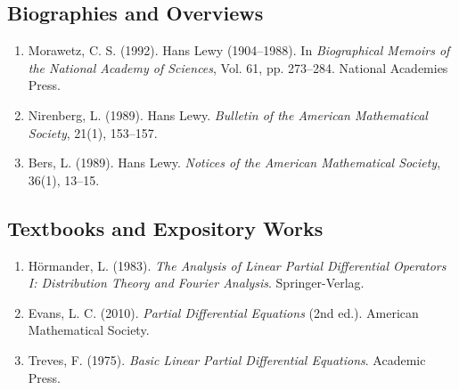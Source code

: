 \subsection*{Biographies and Overviews}
\begin{enumerate}
    \item Morawetz, C. S. (1992). Hans Lewy (1904--1988). In \textit{Biographical Memoirs of the National Academy of Sciences}, Vol. 61, pp. 273--284. National Academies Press.
    \item Nirenberg, L. (1989). Hans Lewy. \textit{Bulletin of the American Mathematical Society}, 21(1), 153--157.
    \item Bers, L. (1989). Hans Lewy. \textit{Notices of the American Mathematical Society}, 36(1), 13--15.
\end{enumerate}

\subsection*{Textbooks and Expository Works}
\begin{enumerate}
    \item Hörmander, L. (1983). \textit{The Analysis of Linear Partial Differential Operators I: Distribution Theory and Fourier Analysis}. Springer-Verlag.
    \item Evans, L. C. (2010). \textit{Partial Differential Equations} (2nd ed.). American Mathematical Society.
    \item Treves, F. (1975). \textit{Basic Linear Partial Differential Equations}. Academic Press.
\end{enumerate}
